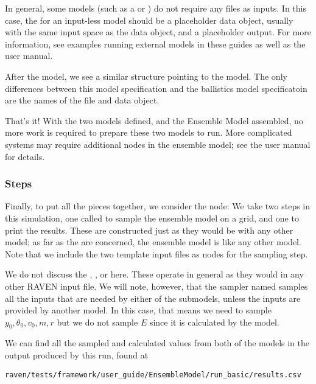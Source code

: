 In general, some models (such as a  or ) do not require any files as
inputs.  In this case, the  for an input-less model should be a placeholder data object,
usually with the same input space as the  data object, and a placeholder output.
For more information, see examples running external models in these guides as well as the user manual.

After the  model, we see a similar structure pointing to the  model.
The only differences between this model specification and the ballistics model specificatoin are the names of
the  file and  data object.

That's it!  With the two models defined, and the Ensemble Model assembled, no more work is required to
prepare these two models to run.  More complicated systems may require additional nodes in the ensemble model;
see the user manual for details.

\subsubsection{Steps}
Finally, to put all the pieces together, we consider the  node:
We take two steps in this simulation, one  called  to sample the ensemble model on a grid,
and one  to print the results.  These are constructed just as they would be with any other
model; as far as the  are concerned, the ensemble model is like any other model.  Note that we
include the two template input files as  nodes for the sampling step.

We do not discuss the , , or 
here.  These operate in general as they would in any other RAVEN input file.  We will note, however, that the
 sampler named  samples all the inputs that are needed by either of the submodels,
unless the inputs are provided by another model.  In this case, that means we need to sample
$y_0,\theta_0,v_0,m,r$ but we do not sample $E$ since it is calculated by the  model.

We can find all the sampled and calculated values from both of the models in the output produced by this run,
found at
\begin{verbatim}
raven/tests/framework/user_guide/EnsembleModel/run_basic/results.csv
\end{verbatim}



